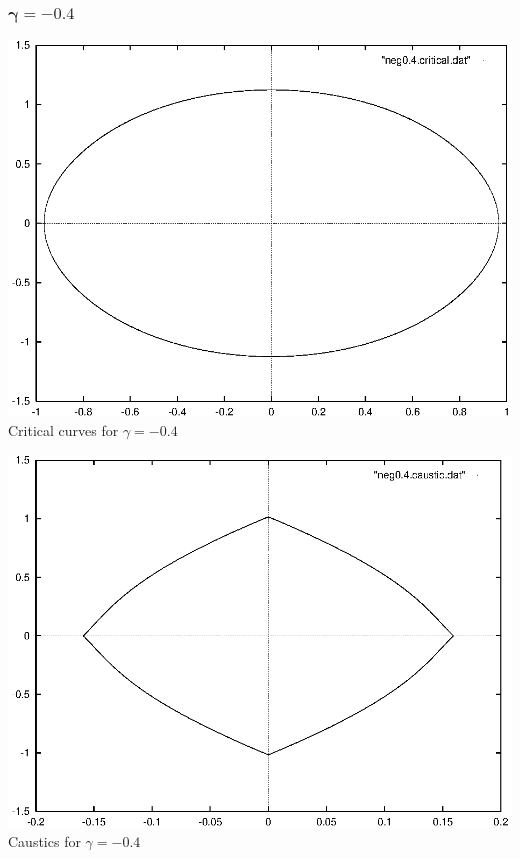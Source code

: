 \documentclass[a4paper]{IEEEtran}
\begin{document}
    \subsubsection{$\mathbf{\gamma = -0.4}$}
    \begin{center}
        \includegraphics{images/neg0-4-critical.eps} 
        \\[1mm]
        Critical curves for $\gamma = -0.4$
    \end{center}
    \begin{center}
        \includegraphics{images/neg0-4-caustic.eps} 
        \\[1mm]
        Caustics for $\gamma = -0.4$
    \end{center}
\end{document}
